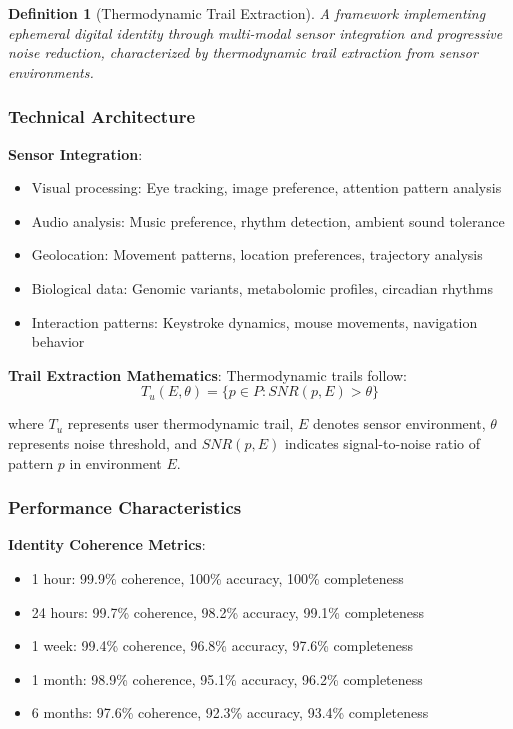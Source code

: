 \documentclass[12pt,a4paper]{article}
\newtheorem{definition}[theorem]{Definition}
\begin{document}
\begin{definition}[Thermodynamic Trail Extraction]
A framework implementing ephemeral digital identity through multi-modal sensor integration and progressive noise reduction, characterized by thermodynamic trail extraction from sensor environments.
\end{definition}

\subsubsection{Technical Architecture}

\textbf{Sensor Integration}:
\begin{itemize}
\item Visual processing: Eye tracking, image preference, attention pattern analysis
\item Audio analysis: Music preference, rhythm detection, ambient sound tolerance
\item Geolocation: Movement patterns, location preferences, trajectory analysis
\item Biological data: Genomic variants, metabolomic profiles, circadian rhythms
\item Interaction patterns: Keystroke dynamics, mouse movements, navigation behavior
\end{itemize}

\textbf{Trail Extraction Mathematics}:
Thermodynamic trails follow:
$$T_u(E, \theta) = \{p \in P : SNR(p, E) > \theta\}$$

where $T_u$ represents user thermodynamic trail, $E$ denotes sensor environment, $\theta$ represents noise threshold, and $SNR(p, E)$ indicates signal-to-noise ratio of pattern $p$ in environment $E$.

\subsubsection{Performance Characteristics}

\textbf{Identity Coherence Metrics}:
\begin{itemize}
\item 1 hour: 99.9\% coherence, 100\% accuracy, 100\% completeness
\item 24 hours: 99.7\% coherence, 98.2\% accuracy, 99.1\% completeness  
\item 1 week: 99.4\% coherence, 96.8\% accuracy, 97.6\% completeness
\item 1 month: 98.9\% coherence, 95.1\% accuracy, 96.2\% completeness
\item 6 months: 97.6\% coherence, 92.3\% accuracy, 93.4\% completeness
\end{itemize}
\end{document}
